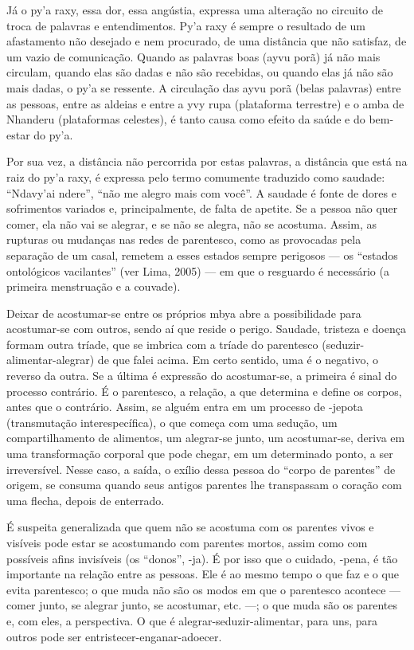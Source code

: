 Já o py’a raxy, essa dor, essa angústia, expressa uma alteração no
circuito de troca de palavras e entendimentos. Py’a raxy é sempre o
resultado de um afastamento não desejado e nem procurado, de uma
distância que não satisfaz, de um vazio de comunicação. Quando as
palavras boas (ayvu porã) já não mais circulam, quando elas são dadas e
não são recebidas, ou quando elas já não são mais dadas, o py’a se
ressente. A circulação das ayvu porã (belas palavras) entre as pessoas,
entre as aldeias e entre a yvy rupa (plataforma terrestre) e o amba de
Nhanderu (plataformas celestes), é tanto causa como efeito da saúde e
do bem-estar do py’a.

Por sua vez, a distância não percorrida por estas palavras, a distância
que está na raiz do py’a raxy, é expressa pelo termo comumente
traduzido como saudade: ``Ndavy’ai ndere'', ``não me alegro mais com
você''. A saudade é fonte de dores e sofrimentos variados e,
principalmente, de falta de apetite. Se a pessoa não quer comer, ela
não vai se alegrar, e se não se alegra, não se acostuma. Assim, as
rupturas ou mudanças nas redes de parentesco, como as provocadas pela
separação de um casal, remetem a esses estados sempre perigosos — os
``estados ontológicos vacilantes'' (ver Lima, 2005) — em que o resguardo
é necessário (a primeira menstruação e a couvade). 

Deixar de acostumar-se entre os próprios mbya abre a possibilidade para
acostumar-se com outros, sendo aí que reside o perigo. Saudade,
tristeza e doença formam outra tríade, que se imbrica com a tríade do
parentesco (seduzir-alimentar-alegrar) de que falei acima. Em certo
sentido, uma é o negativo, o reverso da outra. Se a última é expressão
do acostumar-se, a primeira é sinal do processo contrário. É o
parentesco, a relação, a que determina e define os corpos, antes que o
contrário. Assim, se alguém entra em um processo de -jepota
(transmutação interespecífica), o que começa com uma sedução, um
compartilhamento de alimentos, um alegrar-se junto, um acostumar-se,
deriva em uma transformação corporal que pode chegar, em um determinado
ponto, a ser irreversível. Nesse caso, a saída, o exílio dessa pessoa
do ``corpo de parentes'' de origem, se consuma quando seus antigos
parentes lhe transpassam o coração com uma flecha, depois de
enterrado. 

É suspeita generalizada que quem não se acostuma com os parentes vivos e
visíveis pode estar se acostumando com parentes mortos, assim como com
possíveis afins invisíveis (os ``donos'', -ja). É por isso que o cuidado,
-pena, é tão importante na relação entre as pessoas. Ele é ao mesmo
tempo o que faz e o que evita parentesco; o que muda não são os modos
em que o parentesco acontece — comer junto, se alegrar junto, se
acostumar, etc. —; o que muda são os parentes e, com eles, a
perspectiva. O que é alegrar-seduzir-alimentar, para uns, para outros
pode ser entristecer-enganar-adoecer. 

